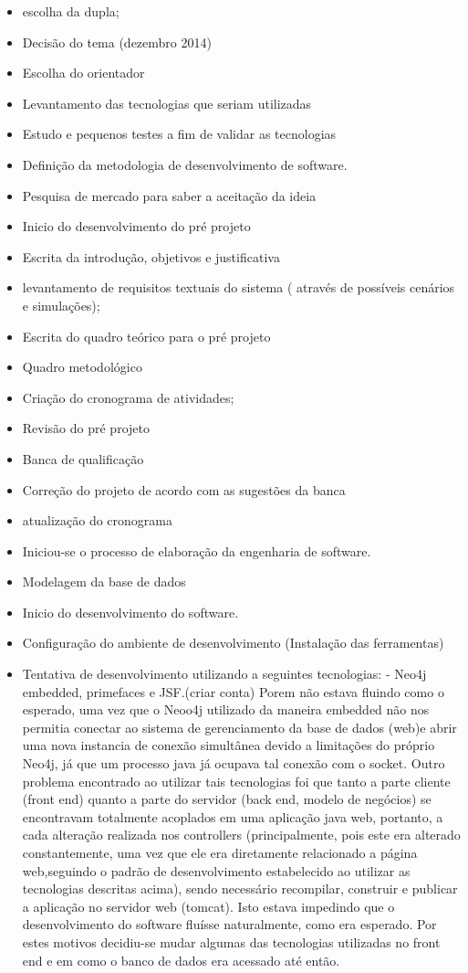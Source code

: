 \begin{itemize}
	\item escolha da dupla;
	\item Decisão do tema (dezembro 2014)
	\item Escolha do orientador
	\item Levantamento das tecnologias que seriam utilizadas
	\item Estudo e pequenos testes a fim de validar as tecnologias
	\item Definição da metodologia de desenvolvimento de software.
	\item Pesquisa de mercado para saber a aceitação da ideia
	\item Inicio do desenvolvimento do pré projeto
	\item Escrita da introdução, objetivos e justificativa
	\item levantamento de requisitos textuais do sistema ( através de possíveis cenários e simulações);
	\item Escrita do quadro teórico para o pré projeto 
	\item Quadro metodológico
	\item Criação do cronograma de atividades;
	\item Revisão do pré projeto
	\item Banca de qualificação
	\item Correção do projeto de acordo com as sugestões da banca
	\item atualização do cronograma	
	\item Iniciou-se o processo de elaboração da engenharia de software.
	\item Modelagem da base de dados
	\item Inicio do desenvolvimento do software.	
	\item Configuração do ambiente de desenvolvimento (Instalação das ferramentas)
	\item Tentativa de desenvolvimento utilizando a seguintes tecnologias:
		- Neo4j embedded, primefaces e JSF.(criar conta) Porem não estava fluindo como o esperado, uma vez que o Neoo4j utilizado da maneira embedded não nos permitia conectar ao sistema de gerenciamento da base de dados (web)e abrir uma nova instancia de conexão simultânea devido a limitações do próprio Neo4j, já que um processo java já ocupava tal conexão com o socket.
		Outro problema encontrado ao utilizar tais tecnologias foi que tanto a parte cliente (front end) quanto a parte do servidor (back end, modelo de negócios) se encontravam totalmente acoplados em uma aplicação java web, portanto, a cada alteração realizada nos controllers (principalmente, pois este era alterado constantemente, uma vez que ele era diretamente relacionado a página web,seguindo o padrão de desenvolvimento estabelecido ao utilizar as tecnologias descritas acima), sendo necessário recompilar, construir e publicar a aplicação no servidor web (tomcat). Isto estava impedindo que o desenvolvimento do software fluísse naturalmente, como era esperado. Por estes motivos decidiu-se mudar algumas das tecnologias utilizadas no front end e em como o banco de dados era acessado até então. 

\end{itemize}
